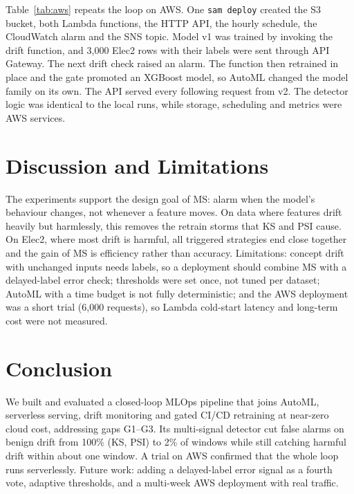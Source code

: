 \documentclass[conference]{IEEEtran}
\newcommand{\ours}{\textsc{MS}}
\begin{document}
Table~\ref{tab:aws} repeats the loop on AWS. One \texttt{sam deploy} created the S3 bucket, both Lambda functions, the HTTP API, the hourly schedule, the CloudWatch alarm and the SNS topic. Model v1 was trained by invoking the drift function, and 3{,}000 Elec2 rows with their labels were sent through API Gateway. The next drift check raised an alarm. The function then retrained in place and the gate promoted an XGBoost model, so AutoML changed the model family on its own. The API served every following request from v2. The detector logic was identical to the local runs, while storage, scheduling and metrics were AWS services.

\section{Discussion and Limitations}
The experiments support the design goal of \ours: alarm when the model's behaviour changes, not whenever a feature moves. On data where features drift heavily but harmlessly, this removes the retrain storms that KS and PSI cause. On Elec2, where most drift is harmful, all triggered strategies end close together and the gain of \ours{} is efficiency rather than accuracy. Limitations: concept drift with unchanged inputs needs labels, so a deployment should combine \ours{} with a delayed-label error check; thresholds were set once, not tuned per dataset; AutoML with a time budget is not fully deterministic; and the AWS deployment was a short trial (6{,}000 requests), so Lambda cold-start latency and long-term cost were not measured.

\section{Conclusion}
We built and evaluated a closed-loop MLOps pipeline that joins AutoML, serverless serving, drift monitoring and gated CI/CD retraining at near-zero cloud cost, addressing gaps G1--G3. Its multi-signal detector cut false alarms on benign drift from 100\% (KS, PSI) to 2\% of windows while still catching harmful drift within about one window. A trial on AWS confirmed that the whole loop runs serverlessly. Future work: adding a delayed-label error signal as a fourth vote, adaptive thresholds, and a multi-week AWS deployment with real traffic.




\end{document}
